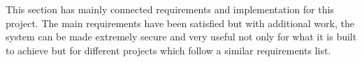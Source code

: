 \documentclass[../main.tex]{subfiles}
\begin{document}
\raggedright
This section has mainly connected requirements and implementation for this project. The main requirements have been satisfied but with additional work, the system can be made extremely secure and very useful not only for what it is built to achieve but for different projects which follow a similar requirements list. 
\end{document}
